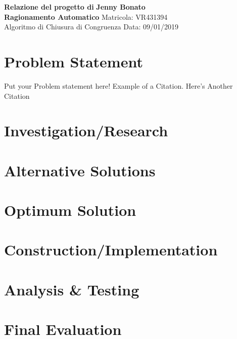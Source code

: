 \documentclass[a4paper, 11pt]{article}
\begin{document}
\noindent
\large\textbf{Relazione del progetto di} \hfill \textbf{Jenny Bonato} \\
\large\textbf{Ragionamento Automatico} \hfill Matricola: VR431394 \\
Algoritmo di Chiusura di Congruenza \hfill Data: 09/01/2019 \\

\section*{Problem Statement}
Put your Problem statement here! Example of a Citation\cite[p.219]{Robotics}. Here's Another Citation\cite{Flueck}

\section*{Investigation/Research}
\lipsum[2]

\section*{Alternative Solutions}
\lipsum[3]

\section*{Optimum Solution}
\lipsum[4]

\section*{Construction/Implementation}
\lipsum[5]

\section*{Analysis \& Testing}
\lipsum[6]

\section*{Final Evaluation}
\lipsum[7]
\end{document}
